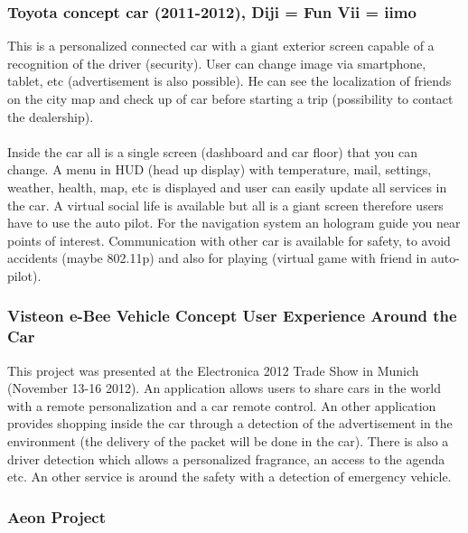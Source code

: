 \documentclass[a4paper]{article}
\begin{document}
\subsubsection{Toyota concept car (2011-2012), Diji = Fun Vii = iimo}

This is a personalized connected car \cite{iimo} with a giant exterior screen capable of a recognition of the driver (security). User can change image via smartphone, tablet, etc (advertisement is also possible). He can see the localization of friends on the city map and check up of car before starting a trip (possibility to contact the dealership). 


\paragraph{}Inside the car all is a single screen (dashboard and car floor) that you can change. A menu in HUD (head up display) with temperature, mail, settings, weather, health, map, etc is displayed and user can easily update all services in the car. A virtual social life is available but all is a giant screen therefore users have to use the auto pilot. For the navigation system an hologram guide you near points of interest. Communication with other car is available for safety, to avoid accidents (maybe 802.11p) and also for playing (virtual game with friend in auto-pilot). 


\subsubsection{Visteon e-Bee Vehicle Concept User Experience Around the Car}

This project \cite{Visteon} was presented at the Electronica 2012 Trade Show in Munich (November 13-16 2012). An application allows users to share cars in the world with a remote personalization and a car remote control. An other application provides shopping inside the car through a detection of the advertisement in the environment (the delivery of the packet will be done in the car). There is also a driver detection which allows a personalized fragrance, an access to the agenda etc. An other service is around the safety with a detection of emergency vehicle. 


\subsubsection{Aeon Project}
\end{document}
